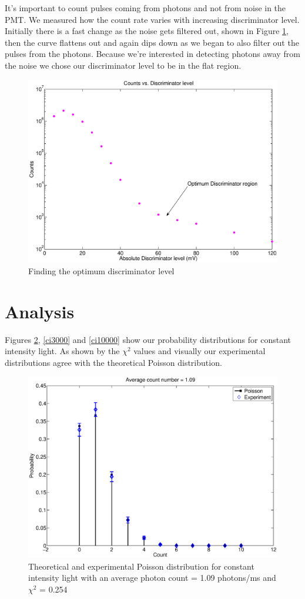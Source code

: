 It's important to count pulses coming from photons and not from noise in the PMT. We measured how the count rate varies with increasing discriminator level. Initially there is a fast change as the noise gets filtered out, shown in Figure \ref{dlevel}, then the curve flattens out and again dips down as we began to also filter out the pulses from the photons. Because we're interested in detecting photons away from the noise we chose our discriminator level to be in the flat region.
\begin{figure}[H]
  \includegraphics[totalheight=0.6\textwidth]{figs/dlevel}
  \caption{Finding the optimum discriminator level}
  \label{dlevel}
\end{figure}

\section{Analysis}
Figures \ref{ci1000}, \ref{ci3000} and \ref{ci10000} show our probability distributions for constant intensity light. As shown by the $\chi^{2}$ values and visually our experimental distributions agree with the theoretical Poisson distribution.
\begin{figure}[H]
  \includegraphics[totalheight=0.6\textwidth]{figs/ci1000}
  \caption{Theoretical and experimental Poisson distribution for constant intensity light with an average photon count = 1.09 photons/ms  and $\chi^{2}$ = 0.254}
  \label{ci1000}
\end{figure}

